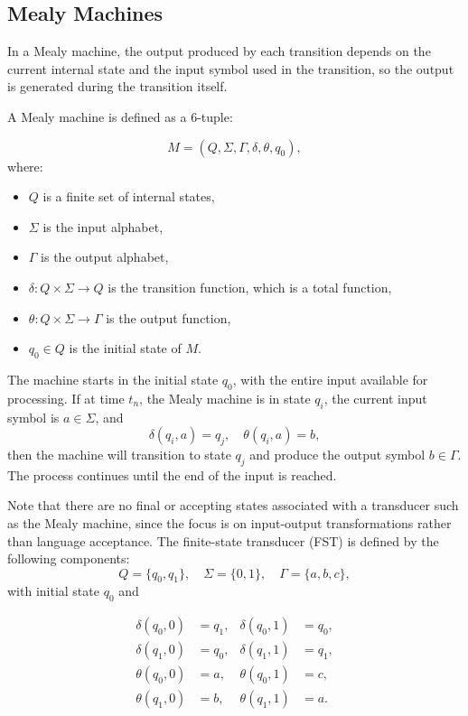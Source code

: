 \subsection{Mealy Machines}

In a Mealy machine, the output produced by each transition depends on the current internal state and 
the input symbol used in the transition, so the output is generated during the transition itself. 

A Mealy machine is defined as a 6-tuple:

\[
M = (Q, \Sigma, \Gamma, \delta, \theta, q_0),
\]
where:
\begin{itemize}
    \item $Q$ is a finite set of internal states,
    \item $\Sigma$ is the input alphabet,
    \item $\Gamma$ is the output alphabet,
    \item $\delta: Q \times \Sigma \rightarrow Q$ is the transition function, which is a total function,
    \item $\theta: Q \times \Sigma \rightarrow \Gamma$ is the output function,
    \item $q_0 \in Q$ is the initial state of $M$.
\end{itemize}

The machine starts in the initial state $q_0$, with the entire input available for processing. 
If at time $t_n$, the Mealy machine is in state $q_i$, the current input symbol is $a \in \Sigma$, and
\[
\delta(q_i, a) = q_j, \quad \theta(q_i, a) = b,
\]
then the machine will transition to state $q_j$ and produce the output symbol $b \in \Gamma$. The process continues until the end of the input is reached.

Note that there are no final or accepting states associated with a transducer such as the Mealy machine, 
since the focus is on input-output transformations rather than language acceptance.
The finite-state transducer (FST) is defined by the following components:
\[
Q = \{q_0, q_1\}, \quad \Sigma = \{0,1\}, \quad \Gamma = \{a, b, c\},
\]
with initial state \( q_0 \) and

\[
\begin{aligned}
\delta(q_0, 0) &= q_1, & \delta(q_0, 1) &= q_0, \\
\delta(q_1, 0) &= q_0, & \delta(q_1, 1) &= q_1, \\
\theta(q_0, 0) &= a, & \theta(q_0, 1) &= c, \\
\theta(q_1, 0) &= b, & \theta(q_1, 1) &= a.
\end{aligned}
\]

